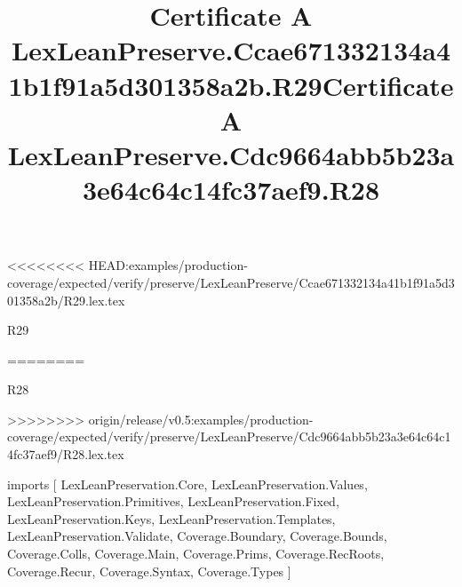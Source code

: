 <<<<<<<< HEAD:examples/production-coverage/expected/verify/preserve/LexLeanPreserve/Ccae671332134a41b1f91a5d301358a2b/R29.lex.tex
\begin{lexlean}{R29}
\title{Certificate A LexLeanPreserve.Ccae671332134a41b1f91a5d301358a2b.R29}
========
\begin{lexlean}{R28}
\title{Certificate A LexLeanPreserve.Cdc9664abb5b23a3e64c64c14fc37aef9.R28}
>>>>>>>> origin/release/v0.5:examples/production-coverage/expected/verify/preserve/LexLeanPreserve/Cdc9664abb5b23a3e64c64c14fc37aef9/R28.lex.tex
\begin{coremodule}
imports [
  LexLeanPreservation.Core,
  LexLeanPreservation.Values,
  LexLeanPreservation.Primitives,
  LexLeanPreservation.Fixed,
  LexLeanPreservation.Keys,
  LexLeanPreservation.Templates,
  LexLeanPreservation.Validate,
  Coverage.Boundary,
  Coverage.Bounds,
  Coverage.Colls,
  Coverage.Main,
  Coverage.Prims,
  Coverage.RecRoots,
  Coverage.Recur,
  Coverage.Syntax,
  Coverage.Types
]


\end{coremodule}
\end{lexlean}
\end{lexlean}
